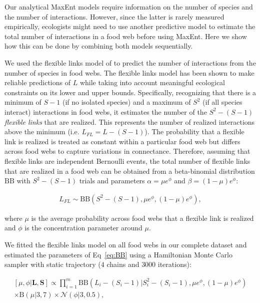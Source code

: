 \begin{box3.1}

Our analytical MaxEnt models require information on the number of species and
the number of interactions. However, since the latter is rarely measured
empirically, ecologists might need to use another predictive model to estimate
the total number of interactions in a food web before using MaxEnt. Here we show
how this can be done by combining both models sequentially.  

We used the flexible links model of \textcite{MacDonald2020Revisiting} to predict the
number of interactions from the number of species in food webs. The flexible
links model has been shown to make reliable predictions of $L$ while taking into
account meaningful ecological constraints on its lower and upper bounds.
Specifically, recognizing that there is a minimum of $S-1$ (if no isolated
species) and a maximum of $S^2$ (if all species interact) interactions in food
webs, it estimates the number of the $S^2 - (S - 1)$ \textit{flexible links}
that are realized. This represents the number of realized interactions above the
minimum (i.e. $L_{FL} = L - (S - 1)$). The probability that a flexible link is
realized is treated as constant within a particular food web but differs across
food webs to capture variations in connectance. Therefore, assuming that
flexible links are independent Bernoulli events, the total number of flexible
links that are realized in a food web can be obtained from a beta-binomial
distribution $\mathrm{BB}$ with $S^2 - (S - 1)$ trials and parameters $\alpha =
\mu e^\phi$ and $\beta = (1 - \mu) e^\phi$:
  
\begin{eqnarray}
  \label{eq:BB}
         L_{FL} \sim \mathrm{BB}(S^2 - (S - 1), \mu e^\phi, (1 - \mu) e^\phi),
\end{eqnarray}
  
where $\mu$ is the average probability across food webs that a flexible link
is realized and $\phi$ is the concentration parameter around $\mu$.
  
We fitted the flexible links model on all food webs in our complete dataset
and estimated the parameters of Eq~\ref{eq:BB} using a Hamiltonian Monte
Carlo sampler with static trajectory ($4$ chains and $3000$ iterations):

\begin{eqnarray*}
  \label{eq:BBpost}
      [\mu, \phi| \textbf{L}, \textbf{S}] \propto \prod_{i = 1}^{m}
      \mathrm{BB}(L_i - (S_i - 1) | S_i^2 - (S_i - 1), \mu e^{\phi}, (1 - \mu)
      e^\phi) \\ \times \mathrm{B}(\mu| 3 , 7 ) \times \mathcal{N}(\phi | 3, 0.5), 
\end{eqnarray*}
  

\end{box3.1}
